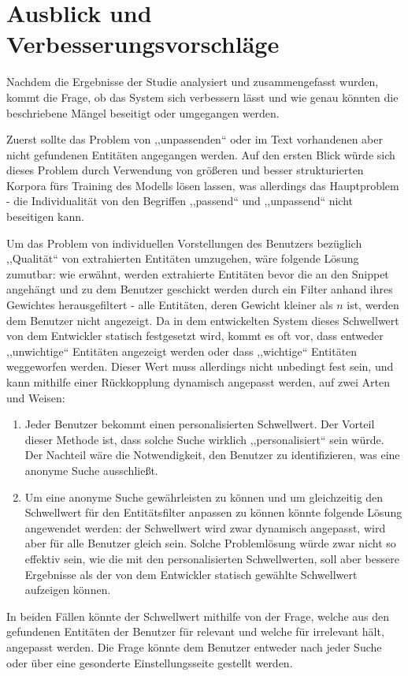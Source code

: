\section{Ausblick und Verbesserungsvorschläge} \label{sec:AUUV}
Nachdem die Ergebnisse der Studie analysiert und zusammengefasst wurden, kommt die Frage, ob das System sich verbessern lässt und wie genau könnten die beschriebene Mängel beseitigt oder umgegangen werden.

Zuerst sollte das Problem von ,,unpassenden`` oder im Text vorhandenen aber nicht gefundenen Entitäten angegangen werden. Auf den ersten Blick würde sich dieses Problem durch Verwendung von größeren und besser strukturierten Korpora fürs Training des Modells lösen lassen, was allerdings das Hauptproblem - die Individualität von den Begriffen ,,passend`` und ,,unpassend`` nicht beseitigen kann.

Um das Problem von individuellen Vorstellungen des Benutzers bezüglich ,,Qualität`` von extrahierten Entitäten umzugehen, wäre folgende Lösung zumutbar: wie erwähnt, werden extrahierte Entitäten bevor die an den Snippet angehängt und zu dem Benutzer geschickt werden durch ein Filter anhand ihres Gewichtes herausgefiltert - alle Entitäten, deren Gewicht kleiner als $n$ ist, werden dem Benutzer nicht angezeigt. Da in dem entwickelten System dieses Schwellwert von dem Entwickler statisch festgesetzt wird, kommt es oft vor, dass entweder ,,unwichtige`` Entitäten angezeigt werden oder dass ,,wichtige`` Entitäten weggeworfen werden. Dieser Wert muss allerdings nicht unbedingt fest sein, und kann mithilfe einer Rückkopplung dynamisch angepasst werden, auf zwei Arten und Weisen:
\begin{enumerate}
\item Jeder Benutzer bekommt einen personalisierten Schwellwert. Der Vorteil dieser Methode ist, dass solche Suche wirklich ,,personalisiert`` sein würde. Der Nachteil wäre die Notwendigkeit, den Benutzer zu identifizieren, was eine anonyme Suche ausschließt. 
\item Um eine anonyme Suche gewährleisten zu können und um gleichzeitig den Schwellwert für den Entitätsfilter anpassen zu können könnte folgende Lösung angewendet werden: der Schwellwert wird zwar dynamisch angepasst, wird aber für alle Benutzer gleich sein. Solche Problemlösung würde zwar nicht so effektiv sein, wie die mit den personalisierten Schwellwerten, soll aber bessere Ergebnisse als der von dem Entwickler statisch gewählte Schwellwert aufzeigen können.
\end{enumerate}
In beiden Fällen könnte der Schwellwert mithilfe von der Frage, welche aus den gefundenen Entitäten der Benutzer für relevant und welche für irrelevant hält, angepasst werden. Die Frage könnte dem Benutzer entweder nach jeder Suche oder über eine gesonderte Einstellungsseite gestellt werden.

